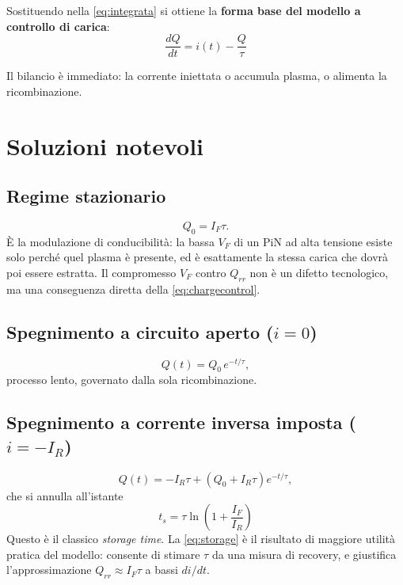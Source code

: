 \documentclass[11pt,a4paper]{article}
\begin{document}
Sostituendo nella \eqref{eq:integrata} si ottiene la \textbf{forma base del modello a
controllo di carica}:
\begin{equation}
  \boxed{\;
  \frac{dQ}{dt} = i(t) - \frac{Q}{\tau}
  \;}
  \label{eq:chargecontrol}
\end{equation}

Il bilancio \`e immediato: la corrente iniettata o accumula plasma, o alimenta la
ricombinazione.

\section{Soluzioni notevoli}

\subsection{Regime stazionario}
\begin{equation}
  Q_0 = I_F \tau .
\end{equation}
\`E la modulazione di conducibilit\`a: la bassa $V_F$ di un PiN ad alta tensione
esiste solo perch\'e quel plasma \`e presente, ed \`e esattamente la stessa carica che
dovr\`a poi essere estratta. Il compromesso $V_F$ contro $Q_{rr}$ non \`e un difetto
tecnologico, ma una conseguenza diretta della \eqref{eq:chargecontrol}.

\subsection{Spegnimento a circuito aperto ($i = 0$)}
\begin{equation}
  Q(t) = Q_0 \, e^{-t/\tau},
\end{equation}
processo lento, governato dalla sola ricombinazione.

\subsection{Spegnimento a corrente inversa imposta ($i = -I_R$)}
\begin{equation}
  Q(t) = -I_R \tau + \left( Q_0 + I_R \tau \right) e^{-t/\tau},
\end{equation}
che si annulla all'istante
\begin{equation}
  \boxed{\;
  t_s = \tau \ln\!\left( 1 + \frac{I_F}{I_R} \right)
  \;}
  \label{eq:storage}
\end{equation}
Questo \`e il classico \emph{storage time}. La \eqref{eq:storage} \`e il risultato di
maggiore utilit\`a pratica del modello: consente di stimare $\tau$ da una misura di
recovery, e giustifica l'approssimazione $Q_{rr} \approx I_F \tau$ a bassi $di/dt$.
\end{document}
